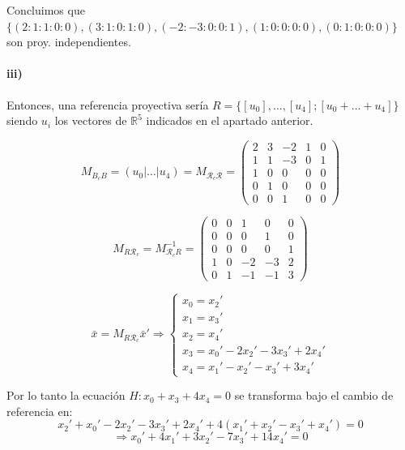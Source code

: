 {Concluimos que $\{(2:1:1:0:0), (3:1:0:1:0), (-2:-3:0:0:1), (1:0:0:0:0), (0:1:0:0:0)\}$ son proy. independientes.

\paragraph{iii)} Entonces, una referencia proyectiva sería $R = \{ [u_0], \dots, [u_4] ; [u_0 + \dots + u_4] \}$ siendo $u_i$ los vectores de $\mathbb{R}^5$ indicados en el apartado anterior.

\[ M_{B_c B} = (u_0 | \dots | u_4) = M_{\mathcal{R}_c \mathcal{R}} = \begin{pmatrix} 2 & 3 & -2 & 1 & 0 \\ 1 & 1 & -3 & 0 & 1 \\ 1 & 0 & 0 & 0 & 0 \\ 0 & 1 & 0 & 0 & 0 \\ 0 & 0 & 1 & 0 & 0 \end{pmatrix} \]

\[ M_{R \mathcal{R}_c} = M_{\mathcal{R}_c R}^{-1} = \begin{pmatrix} 0 & 0 & 1 & 0 & 0 \\ 0 & 0 & 0 & 1 & 0 \\ 0 & 0 & 0 & 0 & 1 \\ 1 & 0 & -2 & -3 & 2 \\ 0 & 1 & -1 & -1 & 3 \end{pmatrix} \]

\[ \bar{x} = M_{R \mathcal{R}_c} \bar{x}' \Rightarrow \begin{cases} x_0 = x_2' \\ x_1 = x_3' \\ x_2 = x_4' \\ x_3 = x_0' - 2x_2' - 3x_3' + 2x_4' \\ x_4 = x_1' - x_2' - x_3' + 3x_4' \end{cases} \]

Por lo tanto la ecuación $H: x_0 + x_3 + 4x_4 = 0$ se transforma bajo el cambio de referencia en:
\[ x_2' + x_0' - 2x_2' - 3x_3' + 2x_4' + 4(x_1' + x_2' - x_3' + x_4') = 0 \]
\[ \Rightarrow x_0' + 4x_1' + 3x_2' - 7x_3' + 14x_4' = 0 \]


}

